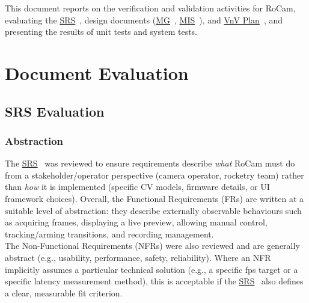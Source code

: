 \documentclass[12pt, titlepage]{article}
\newcommand{\SRS}{\href{../SRS/SRS.pdf}{SRS}}
\newcommand{\VnVPlan}{\href{../VnVPlan/VnVPlan.pdf}{VnV Plan}}
\newcommand{\MG}{\href{../Design/SoftArchitecture/MG.pdf}{MG}}
\newcommand{\MIS}{\href{../Design/SoftDetailedDes/MIS.pdf}{MIS}}
\begin{document}
\listoffigures %

\newpage


This document reports on the verification and validation activities for RoCam,
evaluating the \SRS~\cite{SRS}, design documents (\MG~\cite{MG},
\MIS~\cite{MIS}), and \VnVPlan~\cite{VnVPlan}, and presenting the results of
unit tests and system tests.

\section{Document Evaluation}

\subsection{SRS Evaluation}

\subsubsection{Abstraction}
The \SRS~\cite{SRS} was reviewed to ensure requirements describe \textit{what}
RoCam must do from a stakeholder/operator perspective (camera operator,
rocketry team) rather than \textit{how} it is implemented (specific CV models,
firmware details, or UI framework choices). Overall, the Functional
Requirements (FRs) are written at a suitable level of abstraction: they
describe externally observable behaviours such as acquiring frames, displaying
a live preview, allowing manual control, tracking/arming transitions, and
recording management.\\

The Non-Functional Requirements (NFRs) were also reviewed and are generally
abstract (e.g., usability, performance, safety, reliability). Where an NFR
implicitly assumes a particular technical solution (e.g., a specific fps target
or a specific latency measurement method), this is acceptable if the
\SRS~\cite{SRS} also defines a clear, measurable fit criterion.
\end{document}
